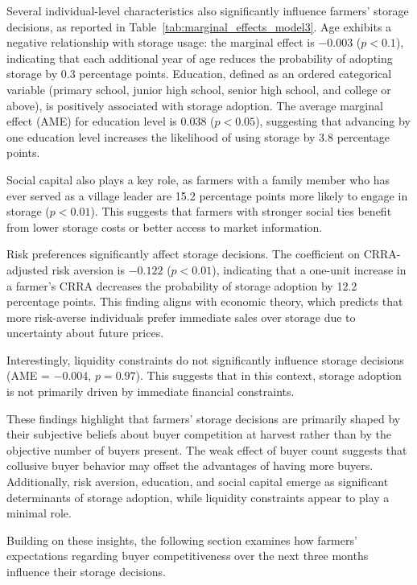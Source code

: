 Several individual-level characteristics also significantly influence farmers' storage decisions, as reported in Table~\ref{tab:marginal_effects_model3}. Age exhibits a negative relationship with storage usage: the marginal effect is \(-0.003\) (\(p<0.1\)), indicating that each additional year of age reduces the probability of adopting storage by 0.3 percentage points. Education, defined as an ordered categorical variable (primary school, junior high school, senior high school, and college or above), is positively associated with storage adoption. The average marginal effect (AME) for education level is 0.038 (\(p<0.05\)), suggesting that advancing by one education level increases the likelihood of using storage by 3.8 percentage points.


Social capital also plays a key role, as farmers with a family member who has ever served as a village leader are 15.2 percentage points more likely to engage in storage (\(p<0.01\)). This suggests that farmers with stronger social ties benefit from lower storage costs or better access to market information.

Risk preferences significantly affect storage decisions. The coefficient on CRRA-adjusted risk aversion is \(-0.122\) (\(p<0.01\)), indicating that a one-unit increase in a farmer's CRRA decreases the probability of storage adoption by 12.2 percentage points. This finding aligns with economic theory, which predicts that more risk-averse individuals prefer immediate sales over storage due to uncertainty about future prices.

Interestingly, liquidity constraints do not significantly influence storage decisions (AME = \(-0.004\), \(p=0.97\)). This suggests that in this context, storage adoption is not primarily driven by immediate financial constraints.

These findings highlight that farmers' storage decisions are primarily shaped by their subjective beliefs about buyer competition at harvest rather than by the objective number of buyers present. The weak effect of buyer count suggests that collusive buyer behavior may offset the advantages of having more buyers. Additionally, risk aversion, education, and social capital emerge as significant determinants of storage adoption, while liquidity constraints appear to play a minimal role.

Building on these insights, the following section examines how farmers' expectations regarding buyer competitiveness over the next three months influence their storage decisions.




